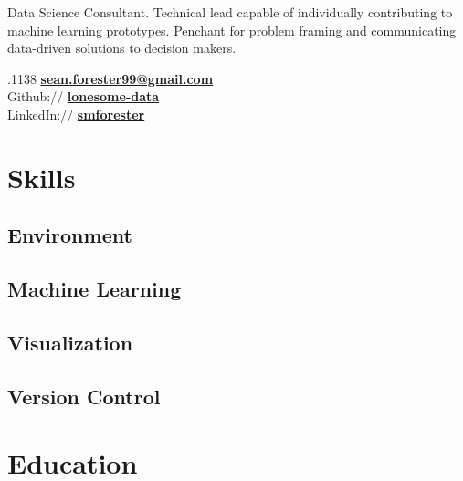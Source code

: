 \documentclass[]{Forester-Resume}
\begin{document}
%
%
\lastupdated

%
%


{ 
Data Science Consultant. Technical lead capable of individually contributing to machine learning prototypes. Penchant for problem framing and communicating data-driven solutions to decision makers. %
}
%
%

\begin{minipage}[t]{0.33\textwidth} 
.1138
\href{mailto:sean.forester99@gmail.com}{\bf sean.forester99@gmail.com}\\
Github:// \href{https://github.com/lonesome-data}{\bf lonesome-data} \\
LinkedIn://  \href{https://www.linkedin.com/in/smforester/}{\bf {smforester}} \\

\section{Skills}
\subsection{Environment}
\subsection{Machine Learning}
\subsection{Visualization}
\subsection{Version Control}

\section{Education} 

\end{minipage}
\end{document}
